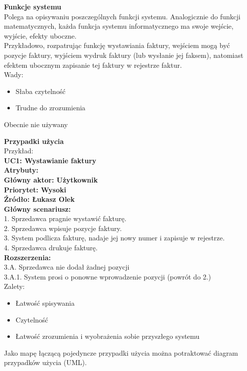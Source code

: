 \documentclass[12pt]{article}
\begin{document}
    \begin{definition}
        \textbf{Funkcje systemu} \\
        Polega na opisywaniu poszczególnych funkcji systemu. Analogicznie do funkcji matematycznych, każda funkcja systemu informatycznego ma swoje wejście, wyjście, efekty uboczne. \\
        Przykładowo, rozpatrując funkcję wystawiania faktury, wejściem mogą być pozycje faktury, wyjściem wydruk faktury (lub wysłanie jej faksem), natomiast efektem ubocznym zapisanie tej faktury w rejestrze faktur. \\

        Wady:
        \begin{itemize}
            \item Słaba czytelność
            \item Trudne do zrozumienia
        \end{itemize}

        Obecnie nie używany
    \end{definition}


    \begin{definition}
        \textbf{Przypadki użycia} \\
        Przykład: \\

        \textbf{UC1: Wystawianie faktury} \\
        \textbf{Atrybuty:} \\
        \textbf{Główny aktor: Użytkownik} \\
        \textbf{Priorytet: Wysoki} \\
        \textbf{Źródło: Łukasz Olek} \\

        \textbf{Główny scenariusz:} \\
        1. Sprzedawca pragnie wystawić fakturę. \\
        2. Sprzedawca wpisuje pozycje faktury. \\
        3. System podlicza fakturę, nadaje jej nowy numer i zapisuje w rejestrze. \\
        4. Sprzedawca drukuje fakturę. \\
        \textbf{Rozszerzenia:} \\
        3.A. Sprzedawca nie dodał żadnej pozycji \\
        3.A.1. System prosi o ponowne wprowadzenie pozycji (powrót do 2.) \\

        Zalety:
        \begin{itemize}
            \item Łatwość spisywania
            \item Czytelność
            \item Łatwość zrozumienia i wyobrażenia sobie przyszłego systemu
        \end{itemize}

    Jako mapę łączącą pojedyncze przypadki użycia można potraktować diagram przypadków użycia (UML).
    \end{definition}
    
\end{document}
